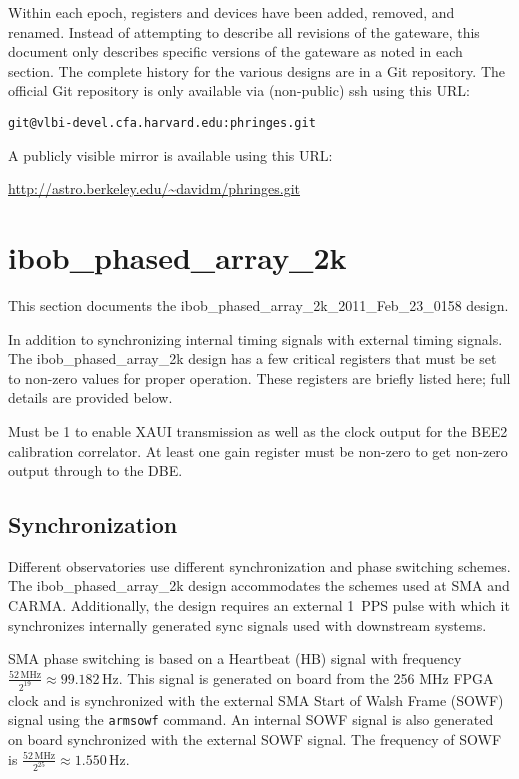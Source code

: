 \documentclass[12pt]{article}
\begin{document}
Within each epoch, registers and devices have been added, removed, and renamed.
Instead of attempting to describe all revisions of the gateware, this document
only describes specific versions of the gateware as noted in each section.  The
complete history for the various designs are in a Git repository.  The official
Git repository is only available via (non-public) ssh using this URL:

\begin{center}
\nolinkurl{git@vlbi-devel.cfa.harvard.edu:phringes.git}
\end{center}

A publicly visible mirror is available using this URL:

\begin{center}
\url{http://astro.berkeley.edu/~davidm/phringes.git}
\end{center}

\section{ibob\_phased\_array\_2k}

This section documents the ibob\_phased\_array\_2k\_2011\_Feb\_23\_0158 design.

In addition to synchronizing internal timing signals with external timing
signals.  The ibob\_phased\_array\_2k design has a few critical registers that
must be set to non-zero values for proper operation.  These registers are
briefly listed here; full details are provided below.

\begin{description}
 Must be 1 to enable XAUI transmission as well as the clock
output for the BEE2 calibration correlator.
 At least one gain register must be non-zero to get
non-zero output through to the DBE.
\end{description}

  \subsection{Synchronization}

Different observatories use different synchronization and phase switching
schemes.  The ibob\_phased\_array\_2k design accommodates the schemes used at
SMA and CARMA.  Additionally, the design requires an external 1~PPS pulse with
which it synchronizes internally generated sync signals used with downstream
systems.

SMA phase switching is based on a Heartbeat (HB) signal with frequency
$\frac{52 \, \mathrm{MHz}}{2^{19}} \approx 99.182 \, \mathrm{Hz}$.  This signal
is generated on board from the 256 MHz FPGA clock and is synchronized with the
external SMA Start of Walsh Frame (SOWF) signal using the \verb|armsowf|
command.  An internal SOWF signal is also generated on board synchronized with
the external SOWF signal.  The frequency of SOWF is $\frac{52 \,
\mathrm{MHz}}{2^{25}} \approx 1.550 \, \mathrm{Hz}$.
\end{document}
